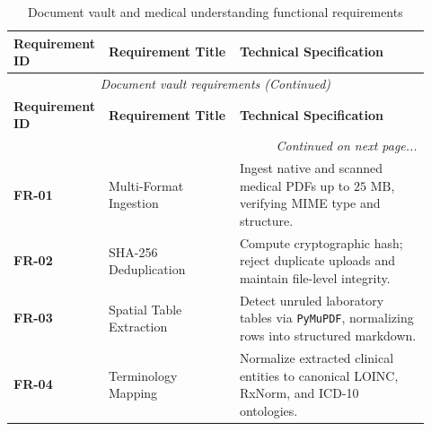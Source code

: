 \small
\begin{longtable}{@{}p{0.16\linewidth} p{0.31\linewidth} p{0.45\linewidth}@{}}
\caption{Document vault and medical understanding functional requirements}\label{tab:3_2_vault_reqs} \\
\toprule
\textbf{Requirement ID} & \textbf{Requirement Title} & \textbf{Technical Specification} \\
\midrule
\endfirsthead
\toprule
\multicolumn{3}{c}{\small\textit{Document vault requirements (Continued)}} \\[4pt]
\midrule
\textbf{Requirement ID} & \textbf{Requirement Title} & \textbf{Technical Specification} \\
\midrule
\endhead
\midrule
\multicolumn{3}{r}{\footnotesize\textit{Continued on next page...}} \\
\bottomrule
\endfoot
\bottomrule
\endlastfoot
\textbf{FR-01} & Multi-Format Ingestion & Ingest native and scanned medical PDFs up to $25\text{ MB}$, verifying MIME type and structure. \\
\midrule
\textbf{FR-02} & SHA-256 Deduplication & Compute cryptographic hash; reject duplicate uploads and maintain file-level integrity. \\
\midrule
\textbf{FR-03} & Spatial Table Extraction & Detect unruled laboratory tables via \texttt{PyMuPDF}, normalizing rows into structured markdown. \\
\midrule
\textbf{FR-04} & Terminology Mapping & Normalize extracted clinical entities to canonical LOINC, RxNorm, and ICD-10 ontologies. \\
\bottomrule
\end{longtable}
\normalsize

